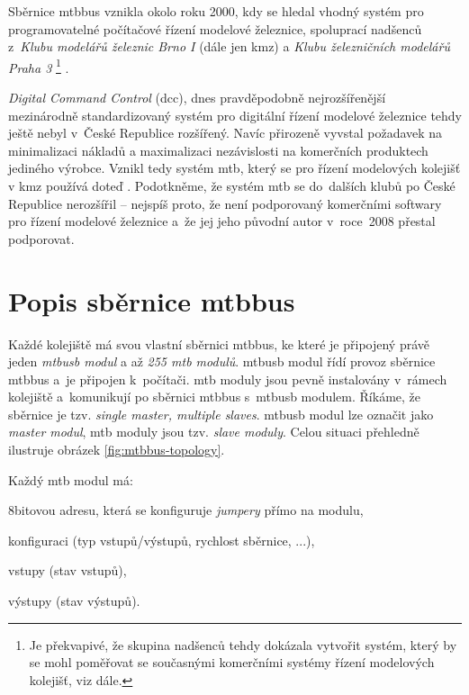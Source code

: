 Sběrnice \gls{mtbbus} vznikla okolo roku 2000, kdy se hledal vhodný systém pro
programovatelné počítačové řízení modelové železnice, spoluprací nadšenců
z~\textit{Klubu modelářů železnic Brno I} (dále jen \gls{kmz}) a \textit{Klubu
železničních modelářů Praha 3} \footnote{Je překvapivé, že
skupina nadšenců tehdy dokázala vytvořit systém, který by se mohl poměřovat se
současnými komerčními systémy řízení modelových kolejišť, viz dále.} \cite{mtb:web}.

\textit{Digital Command Control} (\gls{dcc}), dnes pravděpodobně
nejrozšířenější\footnotemark\\mezinárodně standardizovaný systém pro digitální
řízení modelové železnice \cite{dcc_intro:web} tehdy ještě nebyl v~České Republice
rozšířený. Navíc přirozeně vyvstal požadavek na minimalizaci nákladů
a maximalizaci nezávislosti na komerčních produktech jediného výrobce. Vznikl
tedy systém \gls{mtb}, který se pro řízení modelových kolejišť v \gls{kmz}
používá doteď \cite{kmz_rizeni:web}. Podotkněme, že systém \gls{mtb} se
do~dalších klubů po České Republice nerozšířil – nejspíš proto, že není
podporovaný komerčními softwary pro řízení modelové železnice a~že jej jeho
původní autor v~roce~2008 přestal podporovat.


\section{Popis sběrnice \gls{mtbbus}} \label{sec:mtbbus}

Každé kolejiště má svou vlastní sběrnici \gls{mtbbus}, ke které je připojený
právě jeden \textit{\gls{mtbusb} modul} a až \textit{255 \gls{mtb} modulů}.
\gls{mtbusb} modul řídí provoz sběrnice \gls{mtbbus} a~je připojen k~počítači.
\gls{mtb} moduly jsou pevně instalovány v~rámech kolejiště a~komunikují po
sběrnici \gls{mtbbus} s~\gls{mtbusb} modulem. Říkáme, že sběrnice je tzv.
\textit{single master, multiple slaves}. \gls{mtbusb} modul lze označit jako
\textit{master modul}, \gls{mtb} moduly jsou tzv. \textit{slave moduly}.
Celou situaci přehledně ilustruje obrázek \ref{fig:mtbbus-topology}.

Každý \gls{mtb} modul má:

\begin{compactenum}
\item 8bitovou adresu, která se konfiguruje \textit{jumpery} přímo na modulu,
\item konfiguraci (typ vstupů/výstupů, rychlost sběrnice, ...),
\item vstupy (stav vstupů),
\item výstupy (stav výstupů).
\end{compactenum}


